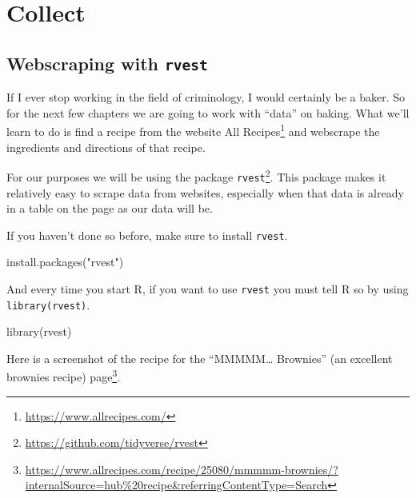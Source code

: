 \documentclass[
]{krantz}
\makeatletter
\newenvironment{Shaded}{\begin{snugshade}}{\end{snugshade}}
\newcommand{\FunctionTok}[1]{\textcolor[rgb]{0,0,0}{#1}}
\newcommand{\NormalTok}[1]{#1}
\newcommand{\StringTok}[1]{\textcolor[rgb]{0.5,0.5,0.5}{#1}}
\renewcommand{\href}[2]{#2\footnote{\url{#1}}}
\newenvironment{kframe}{%
\medskip{}
\setlength{\fboxsep}{.8em}
 \def\at@end@of@kframe{}%
 \ifinner\ifhmode%
  \def\at@end@of@kframe{\end{minipage}}%
  \begin{minipage}{\columnwidth}%
 \fi\fi%
 \def\FrameCommand##1{\hskip\@totalleftmargin \hskip-\fboxsep
 \colorbox{shadecolor}{##1}\hskip-\fboxsep
     \hskip-\linewidth \hskip-\@totalleftmargin \hskip\columnwidth}%
 \MakeFramed {\advance\hsize-\width
   \@totalleftmargin\z@ \linewidth\hsize
   \@setminipage}}%
 {\par\unskip\endMakeFramed%
 \at@end@of@kframe}
\renewenvironment{Shaded}{\begin{kframe}}{\end{kframe}}
\makeatother
\begin{document}
\hypertarget{part-collect}{%
\part{Collect}\label{part-collect}}

\hypertarget{webscraping-with-rvest}{%
\chapter{\texorpdfstring{Webscraping with
\texttt{rvest}}{Webscraping with rvest}}\label{webscraping-with-rvest}}

If I ever stop working in the field of criminology, I would
certainly be a baker. So for the next few chapters we are
going to work with ``data'' on baking. What we'll learn to
do is find a recipe from the website
\href{https://www.allrecipes.com/}{All Recipes} and
webscrape the ingredients and directions of that recipe.

For our purposes we will be using the package
\href{https://github.com/tidyverse/rvest}{\texttt{rvest}}.
This package makes it relatively easy to scrape data from
websites, especially when that data is already in a table on
the page as our data will be.

If you haven't done so before, make sure to install
\texttt{rvest}.

\begin{Shaded}
\begin{Highlighting}[]
\FunctionTok{install.packages}\NormalTok{(}\StringTok{"rvest"}\NormalTok{)}
\end{Highlighting}
\end{Shaded}

And every time you start R, if you want to use
\texttt{rvest} you must tell R so by using
\texttt{library(rvest)}.

\begin{Shaded}
\begin{Highlighting}[]
\FunctionTok{library}\NormalTok{(rvest)}
\end{Highlighting}
\end{Shaded}

Here is a screenshot of the recipe for the ``MMMMM\ldots{}
Brownies'' (an excellent brownies recipe)
\href{https://www.allrecipes.com/recipe/25080/mmmmm-brownies/?internalSource=hub\%20recipe\&referringContentType=Search}{page}.
\end{document}
